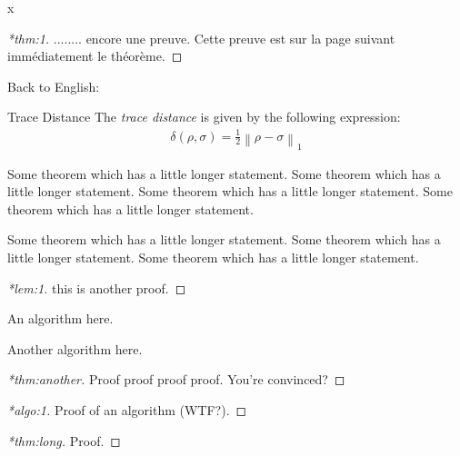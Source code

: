 \documentclass[12pt,a5paper]{article}
\begin{document}
\cleardoublepage

x
\begin{proof}[*thm:1]
  ........ encore une preuve.  Cette preuve est sur la page suivant imm\'ediatement le
  th\'eor\`eme.
\end{proof}

Back to English:

\begin{thmheading}{Trace Distance}
  \label{thmheading:trace-dist}
  The \emph{trace distance} is given by the following expression:
  \begin{align}
    \delta(\rho,\sigma) = \frac12 \left\lVert \rho - \sigma \right\rVert_1
  \end{align}
\end{thmheading}

\begin{theorem}
  \label{thm:long}
  Some theorem which has a little longer statement.
  Some theorem which has a little longer statement.
  Some theorem which has a little longer statement.
  Some theorem which has a little longer statement.

  Some theorem which has a little longer statement.
  Some theorem which has a little longer statement.
  Some theorem which has a little longer statement.
\end{theorem}

\cleardoublepage

\begin{proof}[*lem:1]
  this is another proof.
\end{proof}

\begin{algorithm}
  \label{algo:1}
  An algorithm here.
\end{algorithm}

\begin{algorithm}
  \label{algo:2}
  Another algorithm here.
\end{algorithm}

\cleardoublepage

\begin{proof}[*thm:another]
  Proof proof proof proof. You're convinced?
\end{proof}

\begin{proof}[*algo:1]
  Proof of an algorithm (WTF?).
\end{proof}

\begin{proof}[*thm:long]
  Proof.
\end{proof}
\end{document}
